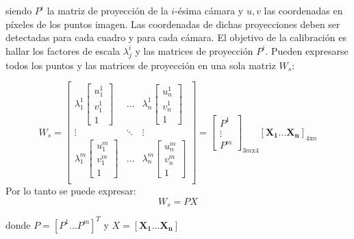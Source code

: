 \hspace{-0.6cm}siendo $P^i$ la matriz de proyección de la $i$-ésima cámara y $u,v$ las coordenadas en píxeles de los puntos imagen. Las coordenadas de dichas proyecciones deben ser detectadas para cada cuadro y para cada cámara. El objetivo de la calibración es hallar los factores de escala $\lambda_j^i$ y las matrices de proyección $P^i$. Pueden expresarse todos los puntos y las matrices de proyección en una sola matriz $W_s$:

\[
W_s =
\begin{bmatrix}

	\lambda_1^1
	\begin{bmatrix}
	u_1^1 \\
	v_1^1 \\
	1
	\end{bmatrix} &
	
	\ldots &
	
	\lambda_n^1
	\begin{bmatrix}
	u_n^1 \\
	v_n^1 \\
	1
	\end{bmatrix} \\
	
	\vdots & \ddots & \vdots \\
	
	
	\lambda_1^m
	\begin{bmatrix}
	u_1^m \\
	v_1^m \\
	1
	\end{bmatrix} &
	
	\ldots &
	
	\lambda_n^m
	\begin{bmatrix}
	u_n^m \\
	v_n^m \\
	1
	\end{bmatrix} \\

\end{bmatrix}
= 
\begin{bmatrix}
P^1 \\
\vdots \\
P^m
\end{bmatrix}_{3m\text{x}4}
\left[ \mathbf{X_1} \ldots \mathbf{X_n}\right] _{4\text{x}n}
\]
Por lo tanto se puede expresar:
\[ W_s = PX\]

\hspace{-0.6cm}donde $P = [P^1 \ldots P^m]^T$ y $X = [\mathbf{X_1} \ldots \mathbf{X_n}]$

